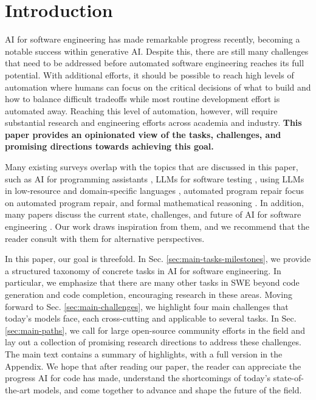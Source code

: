 \section{Introduction}

AI for software engineering has made remarkable progress recently, becoming a notable success within generative AI.
Despite this, there are still many challenges that need to be addressed before automated software engineering reaches its full potential. With additional efforts, it should be possible to reach high levels of automation where humans can focus on the critical decisions of what to build and how to balance difficult tradeoffs while most routine development effort is automated away. Reaching this level of automation, however, will require substantial research and engineering efforts across academia and industry. \textbf{This paper provides an opinionated view of the tasks, challenges, and promising directions towards achieving this goal.}

Many existing surveys overlap with the topics that are discussed in this paper, such as AI for programming assistants \citep{liang2024large, sergeyuk2025using}, LLMs for software testing \citep{wang2024software}, using LLMs in low-resource and domain-specific languages \citep{joel2024survey}, automated program repair \citep{zhang2023survey} focus on automated program repair, and formal mathematical reasoning \citep{yang2024formal}. In addition, many papers discuss the current state, challenges, and future of AI for software engineering \citep{fan2023large, ozkaya2023application, wong2023natural, zheng2023survey, hou2024large, jin2024llms, wan2024deep, roychoudhury2025ai}. Our work draws inspiration from them, and we recommend that the reader consult with them for alternative perspectives. 

In this paper, our goal is threefold. In Sec. \ref{sec:main-tasks-milestones}, we provide a structured taxonomy of concrete tasks in AI for software engineering. In particular, we emphasize that there are many other tasks in SWE beyond code generation and code completion, encouraging research in these areas. Moving forward to Sec. \ref{sec:main-challenges}, we highlight four main challenges that today's models face, each cross-cutting and applicable to several tasks. In Sec. \ref{sec:main-paths}, we call for large open-source community efforts in the field and lay out a collection of promising research directions to address these challenges. The main text contains a summary of highlights, with a full version in the Appendix. We hope that after reading our paper, the reader can appreciate the progress AI for code has made, understand the shortcomings of today's state-of-the-art models, and come together to advance and shape the future of the field. 

